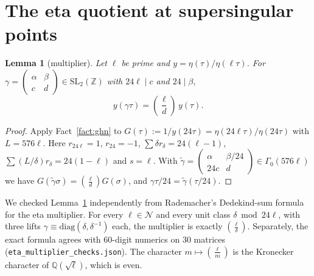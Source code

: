 \documentclass[11pt,a4paper]{article}
\numberwithin{equation}{section}
\newtheorem{lemma}[theorem]{Lemma}
\theoremstyle{definition}
\theoremstyle{remark}
\newcommand{\Z}{\mathbb Z}
\newcommand{\Q}{\mathbb Q}
\newcommand{\leg}[2]{\left(\frac{#1}{#2}\right)}
\begin{document}
\section{The eta quotient at supersingular points}\label{sec:eta}

\begin{lemma}[multiplier]\label{lem:mult}
Let $\ell$ be prime and $y=\eta(\tau)/\eta(\ell\tau)$. For
$\gamma=\begin{pmatrix}\alpha&\beta\\c&d\end{pmatrix}\in\mathrm{SL}_2(\Z)$ with $24\ell\mid c$ and
$24\mid\beta$,
\[
y(\gamma\tau)=\leg{\ell}{d}\,y(\tau).
\]
\end{lemma}
\begin{proof}
Apply Fact~\ref{fact:ghn} to $G(\tau):=1/y(24\tau)=\eta(24\ell\tau)/\eta(24\tau)$ with $L=576\ell$.
Here $r_{24\ell}=1$, $r_{24}=-1$, $\sum\delta r_\delta=24(\ell-1)$, $\sum(L/\delta)r_\delta=24(1-\ell)$ and
$s=\ell$. With $\tilde\gamma=\begin{pmatrix}\alpha&\beta/24\\24c&d\end{pmatrix}\in\Gamma_0(576\ell)$ we have
$G(\tilde\gamma\sigma)=\leg{\ell}{d}G(\sigma)$, and $\gamma\tau/24=\tilde\gamma(\tau/24)$.
\end{proof}

We checked Lemma~\ref{lem:mult} independently from Rademacher's Dedekind-sum formula for the eta
multiplier. For every $\ell\in\mathcal N$ and every unit class $\delta\bmod24\ell$, with three lifts
$\gamma\equiv\mathrm{diag}(\delta,\delta^{-1})$ each, the multiplier is exactly $\leg{\ell}{\delta}$.
Separately, the exact formula agrees with $60$-digit numerics on $30$ matrices
(\texttt{eta\_multiplier\_checks.json}). The character $m\mapsto\leg{\ell}{m}$ is the Kronecker
character of $\Q(\sqrt\ell)$, which is even.
\end{document}
